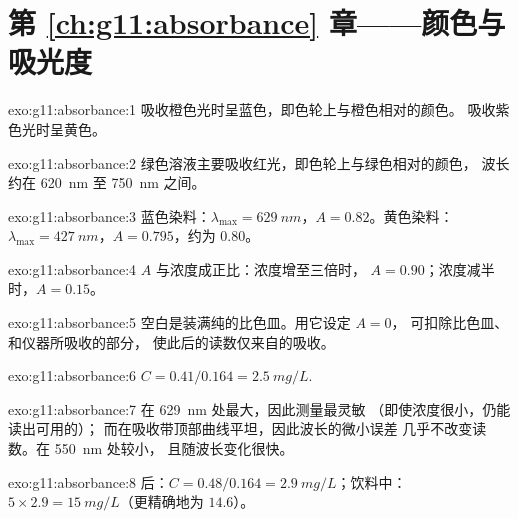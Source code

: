 \section*{第 \ref{ch:g11:absorbance} 章——颜色与吸光度}

\begin{solution}{exo:g11:absorbance:1}
吸收橙色光时呈蓝色，即色轮上与橙色相对的颜色。
吸收紫色光时呈黄色。
\end{solution}

\begin{solution}{exo:g11:absorbance:2}
绿色溶液主要吸收红光，即色轮上与绿色相对的颜色，
波长约在 \qty{620}{nm} 至 \qty{750}{nm} 之间。
\end{solution}

\begin{solution}{exo:g11:absorbance:3}
蓝色染料：$\lambda_{\max} = \qty{629}{nm}$，$A = 0.82$。黄色染料：
$\lambda_{\max} = \qty{427}{nm}$，$A = 0.795$，约为 0.80。
\end{solution}

\begin{solution}{exo:g11:absorbance:4}
$A$ 与浓度成正比：浓度增至三倍时，
$A = 0.90$；浓度减半时，$A = 0.15$。
\end{solution}

\begin{solution}{exo:g11:absorbance:5}
空白是装满纯的比色皿。用它设定 $A = 0$，
可扣除比色皿、和仪器所吸收的部分，
使此后的读数仅来自的吸收。
\end{solution}

\begin{solution}{exo:g11:absorbance:6}
$C = 0.41 / 0.164 = \qty{2.5}{mg/L}$.
\end{solution}

\begin{solution}{exo:g11:absorbance:7}
在 \qty{629}{nm} 处最大，因此测量最灵敏
（即使浓度很小，仍能读出可用的）；
而在吸收带顶部曲线平坦，因此波长的微小误差
几乎不改变读数。在 \qty{550}{nm} 处较小，
且随波长变化很快。
\end{solution}

\begin{solution}{exo:g11:absorbance:8}
后：$C = 0.48 / 0.164 = \qty{2.9}{mg/L}$；饮料中：
$5 \times 2.9 = \qty{15}{mg/L}$（更精确地为 $14.6$）。
\end{solution}

